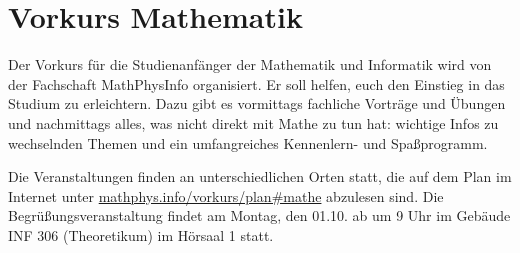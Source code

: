 \section{Vorkurs Mathematik}
Der Vorkurs für die Studienanfänger der Mathematik und Informatik wird von der Fachschaft MathPhysInfo organisiert. Er soll helfen, euch den Einstieg in das Studium zu erleichtern. Dazu gibt es vormittags fachliche Vorträge und Übungen und nachmittags alles, was nicht direkt mit Mathe zu tun hat: wichtige Infos zu wechselnden Themen und ein umfangreiches Kennenlern- und Spaßprogramm.

Die Veranstaltungen finden an unterschiedlichen Orten statt, die auf dem Plan im Internet  unter \url{mathphys.info/vorkurs/plan\#mathe} abzulesen sind. Die Begrüßungsveranstaltung findet am Montag, den 01.10. ab um 9 Uhr im Gebäude \gls{INF} 306 (Theoretikum) im Hörsaal 1 statt.
